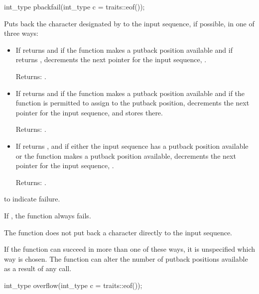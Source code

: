 %
\begin{itemdecl}
int_type pbackfail(int_type c = traits::eof());
\end{itemdecl}

\begin{itemdescr}
\pnum
\effects
Puts back the character designated by  to the input
sequence, if possible, in one of three ways:
\begin{itemize}
\item
If
returns
and
if the function makes a putback position available
and if
returns
,
decrements the next pointer for the input sequence,
.

Returns:
.

\item
If
returns
and
if the function makes a putback position available
and if the function is permitted to assign to the putback position,
decrements the next pointer for the input sequence,
and stores  there.

Returns:
.

\item
If
returns
,
and if either the input sequence has a putback position available or
the function makes a putback position available,
decrements the next pointer for the input sequence,
.

Returns:
.
\end{itemize}

\pnum
\returns
{}
to indicate failure.

\pnum
\notes
If
,
the function always fails.

\pnum
The function does not put back a character directly to the input sequence.

\pnum
If the function can succeed in more than one of these ways, it is
unspecified which way is chosen.
The function can alter the number of putback positions available as a result of any call.
\end{itemdescr}

%
\begin{itemdecl}
int_type overflow(int_type c = traits::eof());
\end{itemdecl}

